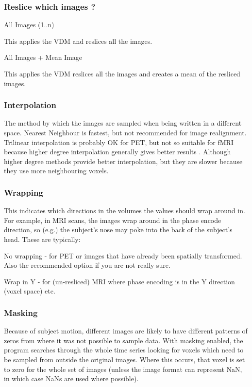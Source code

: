 \subsubsection{Reslice which images ?}
All Images (1..n) 

  This applies the VDM and reslices all the images. 

All Images + Mean Image 

   This applies the VDM reslices all the images and creates a mean of the resliced images.


\subsubsection{Interpolation}
The method by which the images are sampled when being written in a different space. Nearest Neighbour is fastest, but not recommended for image realignment. Trilinear interpolation is probably OK for PET, but not so suitable for fMRI because higher degree interpolation generally gives better results \cite{thevenaz00a,unser93a,unser93b}. Although higher degree methods provide better interpolation, but they are slower because they use more neighbouring voxels.


\subsubsection{Wrapping}
This indicates which directions in the volumes the values should wrap around in.  For example, in MRI scans, the images wrap around in the phase encode direction, so (e.g.) the subject's nose may poke into the back of the subject's head. These are typically:

    No wrapping - for PET or images that have already                   been spatially transformed. Also the recommended option if                   you are not really sure.

    Wrap in  Y  - for (un-resliced) MRI where phase encoding                   is in the Y direction (voxel space) etc.


\subsubsection{Masking}
Because of subject motion, different images are likely to have different patterns of zeros from where it was not possible to sample data. With masking enabled, the program searches through the whole time series looking for voxels which need to be sampled from outside the original images. Where this occurs, that voxel is set to zero for the whole set of images (unless the image format can represent NaN, in which case NaNs are used where possible).


